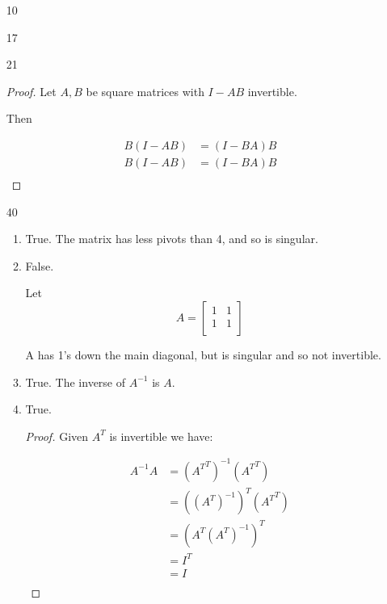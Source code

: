 \documentclass[12pt,letterpaper]{article}
\begin{document}
\begin{enumerate}
\begin{enumerate}
\begin{proof}
            \begin{align*}
              (A^2)^{-1} &= B \\
              (AA)^{-1} &= \\
              A^{-1}A^{-1} &= \\
              A^{-1} &= AB \\
            \end{align*}

            Thus, the inverse of $A$ is $AB$.
          \end{proof}
        \item [10]
        \item [17]
        \item [21]
          \begin{proof}
            Let $A, B$ be square matrices with $I - AB$ invertible.

            Then

            \begin{align*}
              B(I - AB) &= (I - BA)B \\
              B(I - AB) &= (I - BA)B \\
            \end{align*}
          \end{proof}
        \item [40]
          \begin{enumerate}[label=(\alph*)]
            \item True. The matrix has less pivots than 4, and so is singular.
            \item

              False.

              Let
              \[
                A
                =
                \begin{bmatrix}
                  1 & 1 \\
                  1 & 1 \\
                \end{bmatrix}
              \]

              A has 1's down the main diagonal,
              but is singular and so not invertible.
            \item True. The inverse of $A^{-1}$ is $A$.
            \item True.
              \begin{proof}
                Given $A^T$ is invertible we have:

                \begin{align*}
                  A^{-1}A &= \left({A^T}^T\right)^{-1}\left({A^T}^T\right) \\
                  &= \left(\left({A^T}\right)^{-1}\right)^T\left({A^T}^T\right) \\
                  &= \left({A^T}\left({A^T}\right)^{-1}\right)^T \\
                  &= I^T \\
                  &= I \\
                \end{align*}


\end{proof}
\end{enumerate}
\end{enumerate}
\end{enumerate}
\end{document}
